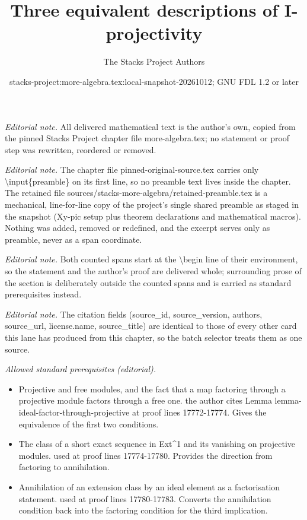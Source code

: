 \documentclass[10pt,a4paper]{amsart}
\title{Three equivalent descriptions of I-projectivity}
\author{The Stacks Project Authors}
\date{stacks-project:more-algebra.tex:local-snapshot-20261012; GNU FDL 1.2 or later}
\theoremstyle{plain}
\theoremstyle{definition}
\theoremstyle{remark}
\numberwithin{equation}{subsection}
\begin{document}
\maketitle
\setcounter{subsection}{1}
\noindent\textit{Editorial note.} All delivered mathematical text is the author's own, copied from the pinned Stacks Project chapter file more-algebra.tex; no statement or proof step was rewritten, reordered or removed.\par\medskip
\noindent\textit{Editorial note.} The chapter file pinned-original-source.tex carries only \textbackslash{}input\{preamble\} on its first line, so no preamble text lives inside the chapter. The retained file sources/stacks-more-algebra/retained-preamble.tex is a mechanical, line-for-line copy of the project's single shared preamble as staged in the snapshot (Xy-pic setup plus theorem declarations and mathematical macros). Nothing was added, removed or redefined, and the excerpt serves only as preamble, never as a span coordinate.\par\medskip
\noindent\textit{Editorial note.} Both counted spans start at the \textbackslash{}begin line of their environment, so the statement and the author's proof are delivered whole; surrounding prose of the section is deliberately outside the counted spans and is carried as standard prerequisites instead.\par\medskip
\noindent\textit{Editorial note.} The citation fields (source\_id, source\_version, authors, source\_url, license.name, source\_title) are identical to those of every other card this lane has produced from this chapter, so the batch selector treats them as one source.\par\medskip
\noindent\textit{Allowed standard prerequisites (editorial).}\begin{itemize}
\item Projective and free modules, and the fact that a map factoring through a projective module factors through a free one. the author cites Lemma lemma-ideal-factor-through-projective at proof lines 17772-17774. Gives the equivalence of the first two conditions.
\item The class of a short exact sequence in Ext\textasciicircum{}1 and its vanishing on projective modules. used at proof lines 17774-17780. Provides the direction from factoring to annihilation.
\item Annihilation of an extension class by an ideal element as a factorisation statement. used at proof lines 17780-17783. Converts the annihilation condition back into the factoring condition for the third implication.
\end{itemize}\medskip
\end{document}
